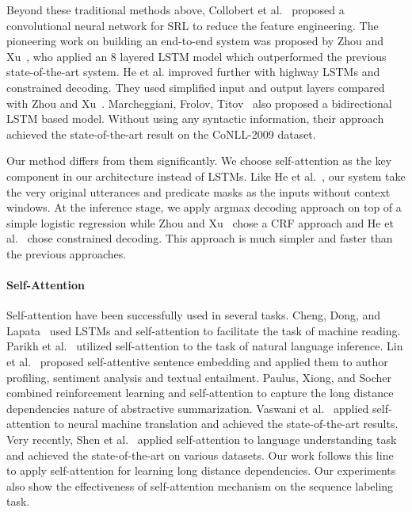 \documentclass[letterpaper]{article} \usepackage{aaai18}  \usepackage{times}  \usepackage{helvet}  \usepackage{courier}  \usepackage{url}  \usepackage{graphicx}  \frenchspacing  \setlength{\pdfpagewidth}{8.5in}  \setlength{\pdfpageheight}{11in}  \usepackage{latexsym}
\begin{document}
Beyond these traditional methods above, Collobert et al.~ proposed a convolutional neural network for SRL to reduce the feature engineering. The pioneering work on building an end-to-end system was proposed by Zhou and Xu~, who applied an 8 layered LSTM model which outperformed the previous state-of-the-art system. He et al. improved further with highway LSTMs and constrained decoding. They used simplified input and output layers compared with Zhou and Xu~. Marcheggiani, Frolov,  Titov~ also proposed a bidirectional LSTM based model. Without using any syntactic information, their approach achieved the state-of-the-art result on the CoNLL-2009 dataset.

Our method differs from them significantly. We choose self-attention as the key component in our architecture instead of LSTMs. Like He et al.~, our system take the very original utterances and predicate masks as the inputs without context windows. At the inference stage, we apply argmax decoding approach on top of a simple logistic regression while Zhou and Xu~ chose a CRF approach and He et al.~ chose constrained decoding. This approach is much simpler and faster than the previous approaches.

\paragraph{Self-Attention} Self-attention have been successfully used in several tasks. Cheng, Dong, and Lapata~ used LSTMs and self-attention to facilitate the task of machine reading. Parikh et al.~ utilized self-attention to the task of natural language inference. Lin et al.~ proposed self-attentive sentence embedding and applied them to author profiling, sentiment analysis and textual entailment. Paulus, Xiong, and Socher~ combined reinforcement learning and self-attention to capture the long distance dependencies nature of abstractive summarization. Vaswani et al.~ applied self-attention to neural machine translation and achieved the state-of-the-art results. Very recently, Shen et al.~ applied self-attention to language understanding task and achieved the state-of-the-art on various datasets. Our work follows this line to apply self-attention for learning long distance dependencies. Our experiments also show the effectiveness of self-attention mechanism on the sequence labeling task.
\end{document}
